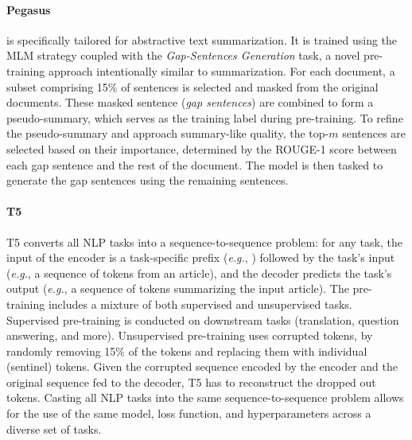 \paragraph{Pegasus} \citep{zhang2020pegasus} is specifically tailored for abstractive text summarization. It is trained using the \ac{MLM} strategy coupled with the \textit{Gap-Sentences Generation} task, a novel pre-training approach intentionally similar to summarization. For each document, a subset comprising 15\% of sentences is selected and masked from the original documents. These masked sentence (\textit{gap sentences}) are combined to form a pseudo-summary, which serves as the training label during pre-training. To refine the pseudo-summary and approach summary-like quality, the top-$m$ sentences are selected based on their importance, determined by the \ac{ROUGE}-1 score between each gap sentence and the rest of the document. The model is then tasked to generate the gap sentences using the remaining sentences.


\paragraph{T5} \ac{T5} \citep{raffel2020exploring} converts all \ac{NLP} tasks into a sequence-to-sequence problem: for any task, the input of the encoder is a task-specific prefix (\textit{e.g.}, ) followed by the task's input (\textit{e.g.}, a sequence of tokens from an article), and the decoder predicts the task's output (\textit{e.g.}, a sequence of tokens summarizing the input article). The pre-training includes a mixture of both supervised and unsupervised tasks. Supervised pre-training is conducted on downstream tasks (translation, question answering, and more). Unsupervised pre-training uses corrupted tokens, by randomly removing 15\% of the tokens and replacing them with individual (sentinel) tokens. Given the corrupted sequence encoded by the encoder and the original sequence fed to the decoder, \ac{T5} has to reconstruct the dropped out tokens. Casting all \ac{NLP} tasks into the same sequence-to-sequence problem allows for the use of the same model, loss function, and hyperparameters across a diverse set of tasks. 

